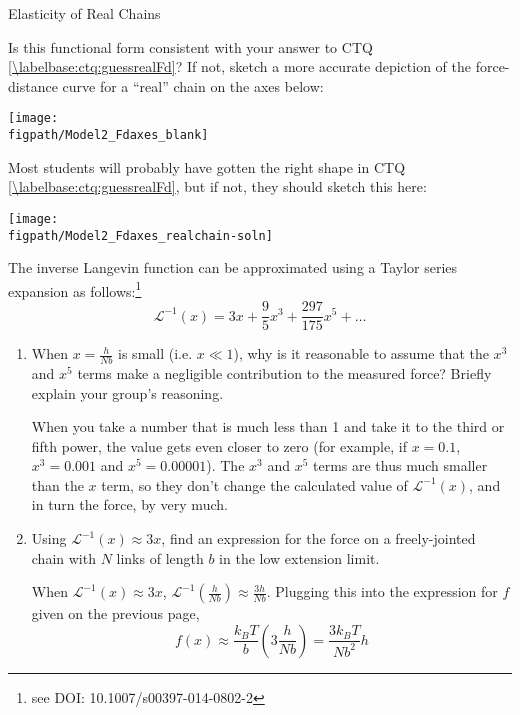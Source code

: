 \begin{activity}[extension]{Elasticity of Real Chains}
\begin{model}
\end{model}

\begin{ctqs}
	
	\question Is this functional form consistent with your answer to CTQ \ref{\labelbase:ctq:guessrealFd}?  If not, sketch a more accurate depiction of the force-distance curve for a ``real'' chain on the axes below:
	
		\begin{solution}[2in]{\centerline{\texttt{[image: \\figpath/Model2\_Fdaxes\_blank]}}}
			Most students will probably have gotten the right shape in CTQ \ref{\labelbase:ctq:guessrealFd}, but if not, they should sketch this here: 
			
			\centerline{\texttt{[image: \\figpath/Model2\_Fdaxes\_realchain-soln]}}
		\end{solution}
	
	\question The inverse Langevin function can be approximated using a Taylor series expansion as follows:\footnote{see DOI: 10.1007/s00397-014-0802-2}
		\begin{equation*}
			\mathcal{L}^{-1}(x) = 3x + \frac{9}{5}x^3 + \frac{297}{175}x^5 + \dots
		\end{equation*}
		
		\begin{enumerate}
			\item When $x=\frac{h}{Nb}$ is small (i.e. $x \ll 1$), why is it reasonable to assume that the $x^3$ and $x^5$ terms make a negligible contribution to the measured force?  Briefly explain your group's reasoning.
			
				\begin{solution}[1.5in]{}
					When you take a number that is much less than 1 and take it to the third or fifth power, the value gets even closer to zero (for example, if $x=0.1$, $x^3=0.001$ and $x^5=0.00001$).  The $x^3$ and $x^5$ terms are thus much smaller than the $x$ term, so they don't change the calculated value of $\mathcal{L}^{-1}(x)$, and in turn the force, by very much.
				\end{solution}
			
			\item Using $\mathcal{L}^{-1}(x) \approx 3x$, find an expression for the force on a freely-jointed chain with $N$ links of length $b$ in the low extension limit. \label{\labelbase:ctq:small-h-approx}
			
				\begin{solution}[1.75in]{}
					When $\mathcal{L}^{-1}(x) \approx 3x$, $\mathcal{L}^{-1}(\frac{h}{Nb}) \approx \frac{3h}{Nb}$.  Plugging this into the expression for $f$ given on the previous page,
					\begin{equation*}
						f(x) \approx \frac{k_BT}{b}\left(3\frac{h}{Nb}\right) = \frac{3k_BT}{Nb^2}h
					\end{equation*}
				\end{solution}
			

\end{enumerate}
\end{ctqs}
\end{activity}
